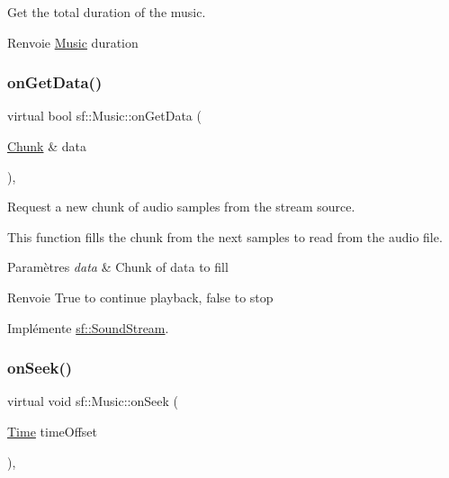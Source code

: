 Get the total duration of the music. 

\begin{DoxyReturn}{Renvoie}
\hyperlink{classsf_1_1Music}{Music} duration 
\end{DoxyReturn}
\mbox{\label{classsf_1_1Music_aca1bcb4e5d56a854133e74bd86374463}} 
\subsubsection{\texorpdfstring{on\+Get\+Data()}{onGetData()}}
{\footnotesize\ttfamily virtual bool sf\+::\+Music\+::on\+Get\+Data (\begin{DoxyParamCaption}\item[{\hyperlink{structsf_1_1SoundStream_1_1Chunk}{Chunk} \&}]{data }\end{DoxyParamCaption})\hspace{0.3cm}{\ttfamily [protected]}, {\ttfamily [virtual]}}



Request a new chunk of audio samples from the stream source. 

This function fills the chunk from the next samples to read from the audio file.


\begin{DoxyParams}{Paramètres}
{\em data} & Chunk of data to fill\\
\hline
\end{DoxyParams}
\begin{DoxyReturn}{Renvoie}
True to continue playback, false to stop 
\end{DoxyReturn}


Implémente \hyperlink{classsf_1_1SoundStream_a968ec024a6e45490962c8a1121cb7c5f}{sf\+::\+Sound\+Stream}.

\mbox{\label{classsf_1_1Music_a15119cc0419c16bb334fa0698699c02e}} 
\subsubsection{\texorpdfstring{on\+Seek()}{onSeek()}}
{\footnotesize\ttfamily virtual void sf\+::\+Music\+::on\+Seek (\begin{DoxyParamCaption}\item[{\hyperlink{classsf_1_1Time}{Time}}]{time\+Offset }\end{DoxyParamCaption})\hspace{0.3cm}{\ttfamily [protected]}, {\ttfamily [virtual]}}



